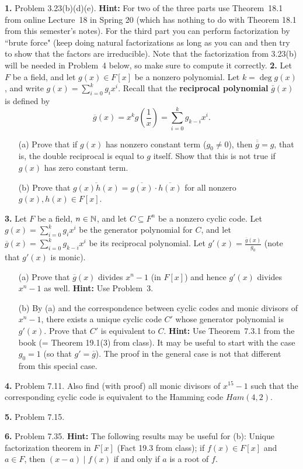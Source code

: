 \documentclass[12pt]{amsart}
\begin{document}
\skv
{\bf 1.} Problem 3.23(b)(d)(e). {\bf Hint:} For two of the three parts use Theorem~18.1 from online Lecture~18 in Spring 20 (which has nothing to do with Theorem 18.1 from this semester's notes). For the third part you can perform factorization by ``brute force" (keep doing natural factorizations as long as you can and then try to show that the factors are irreducible). Note that the factorization from 3.23(b) will be needed in Problem~4 below, so make sure to compute it correctly.
\skv
\skv
{\bf 2.} Let $F$ be a field, and let $g(x)\in F[x]$ be a nonzero polynomial.  Let
$k=\deg g(x)$, and write $g(x)=\sum_{i=0}^k g_i x^i$. Recall that the {\bf reciprocal polynomial} $\bar g(x)$ is defined by 
$${\overline g}(x)=x^k g\left(\frac{1}{x}\right)=\sum_{i=0}^k g_{k-i} x^i.$$ 
\begin{itemize}
\item[(a)] Prove that if $g(x)$ has nonzero constant term ($g_0\neq 0$), then $\overline{{\overline g}}=g$, that is, the double
reciprocal is equal to $g$ itself. Show that this is not true if $g(x)$ has zero constant term.
\item[(b)] Prove that $\overline{g(x) h(x)}=\overline{g(x)}\cdot \overline{h(x)}$ for all nonzero $g(x),h(x)\in F[x]$.
\end{itemize}
\skv
{\bf 3.} Let $F$ be a field, $n\in{\mathbb N}$, and let $C\subseteq F^n$ be a nonzero cyclic code. 
Let $g(x)=\sum_{i=0}^k g_i x^i$ be the generator polynomial for $C$, and let
${\overline g}(x)=\sum\limits_{i=0}^k g_{k-i} x^i$ be its reciprocal polynomial. 
Let $g'(x)=\frac{{\overline g}(x)}{g_0}$ (note that $g'(x)$ is monic).
\begin{itemize}
\item[(a)] Prove that $\overline g(x)$ divides $x^n-1$ (in $F[x]$) and hence $g'(x)$ divides $x^n-1$ as well. {\bf Hint:} Use Problem~3.
\item[(b)] By (a) and the correspondence between cyclic codes and monic divisors of $x^n-1$, there exists a unique cyclic code $C'$
whose generator polynomial is $g'(x)$. Prove that $C'$ is equivalent to $C$.  {\bf Hint:} Use Theorem~7.3.1 from the book (= Theorem 19.1(3)
from class). It may be useful to start with the case $g_0=1$ (so that $g'=\overline g$). The proof in the general case is not that different from this special case. 
\end{itemize}
\skv

{\bf 4.} Problem 7.11. Also find (with proof) all monic divisors of $x^{15}-1$ such that the corresponding cyclic code is equivalent to the Hamming code $Ham(4,2)$.
\skv
\skv

{\bf 5.} Problem 7.15.
\skv
\skv


{\bf 6.} Problem 7.35. {\bf Hint:} The following results may be useful for (b): Unique factorization theorem in $F[x]$ (Fact 19.3 from class);
if $f(x)\in F[x]$ and $a\in F$, then $(x-a) \mid f(x)$ if and only if $a$ is a root of $f$.
\end{document}
